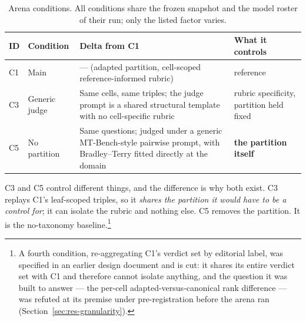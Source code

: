 \begin{table}[h]
    \centering
    \caption{Arena conditions. All conditions share the frozen
    snapshot and the model roster of their run; only the listed factor
    varies.}
    \label{tab:arena-conditions}
    \begin{tabular}{p{0.9cm}p{2.7cm}p{4.4cm}p{4.0cm}}
        \toprule
        ID & Condition & Delta from C1 & What it controls \\
        \midrule
        C1 & Main
        & --- (adapted partition, cell-scoped reference-informed rubric)
        & reference \\
        \addlinespace
        C3 & Generic judge
        & Same cells, same triples; the judge prompt is a shared
        structural template with no cell-specific rubric
        & rubric specificity, partition held fixed \\
        \addlinespace
        C5 & No partition
        & Same questions; judged under a generic MT-Bench-style
        pairwise prompt, with Bradley--Terry fitted directly at the
        domain
        & \textbf{the partition itself} \\
        \bottomrule
    \end{tabular}
\end{table}

C3 and C5 control different things, and the difference is why both
exist. C3 replays C1's leaf-scoped triples, so it \emph{shares the
partition it would have to be a control for}; it can isolate the rubric
and nothing else. C5 removes the partition. It is the no-taxonomy
baseline.\footnote{A fourth condition, re-aggregating C1's verdict set
by editorial label, was specified in an earlier design document and is
cut: it shares its entire verdict set with C1 and therefore cannot
isolate anything, and the question it was built to answer --- the
per-cell adapted-versus-canonical rank difference --- was refuted at
its premise under pre-registration before the arena ran
(Section~\ref{sec:res-granularity}).}


